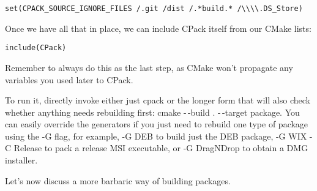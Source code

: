 \begin{lstlisting}[style=styleCMake]
set(CPACK_SOURCE_IGNORE_FILES /.git /dist /.*build.* /\\\\.DS_Store)
\end{lstlisting}

Once we have all that in place, we can include CPack itself from our CMake lists:

\begin{lstlisting}[style=styleCMake]
include(CPack)
\end{lstlisting}

Remember to always do this as the last step, as CMake won't propagate any variables you used later to CPack. 

To run it, directly invoke either just cpack or the longer form that will also check whether anything needs rebuilding first: cmake -\,-build . -\,-target package. You can easily override the generators if you just need to rebuild one type of package using the -G flag, for example, -G DEB to build just the DEB package, -G WIX -C Release to pack a release MSI executable, or -G DragNDrop to obtain a DMG installer.

Let's now discuss a more barbaric way of building packages.
